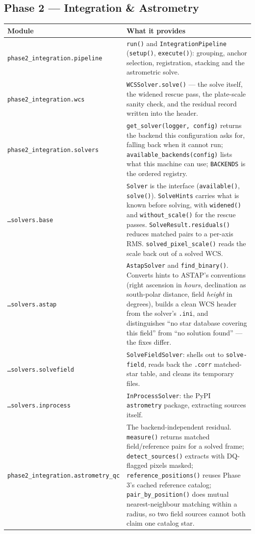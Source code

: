 \documentclass[11pt,a4paper]{article}
\begin{document}
\subsection{Phase 2 --- Integration \& Astrometry}
\begin{center}
\begin{longtable}{|p{3.6cm}|p{10.9cm}|}
\hline
\textbf{Module} & \textbf{What it provides} \\
\hline
\endhead
\texttt{phase2\_integration.\allowbreak pipeline} & \texttt{run()} and \texttt{IntegrationPipeline} (\texttt{setup()}, \texttt{execute()}): grouping, anchor selection, registration, stacking and the astrometric solve. \\
\hline
\texttt{phase2\_integration.\allowbreak wcs} & \texttt{WCSSolver.solve()} --- the solve itself, the widened rescue pass, the plate-scale sanity check, and the residual record written into the header. \\
\hline
\texttt{phase2\_integration.\allowbreak solvers} & \texttt{get\_solver(logger, config)} returns the backend this configuration asks for, falling back when it cannot run; \texttt{available\_backends(config)} lists what this machine can use; \texttt{BACKENDS} is the ordered registry. \\
\hline
\texttt{\ldots solvers.base} & \texttt{Solver} is the interface (\texttt{available()}, \texttt{solve()}). \texttt{SolveHints} carries what is known before solving, with \texttt{widened()} and \texttt{without\_scale()} for the rescue passes. \texttt{SolveResult.residuals()} reduces matched pairs to a per-axis RMS. \texttt{solved\_pixel\_scale()} reads the scale back out of a solved WCS. \\
\hline
\texttt{\ldots solvers.astap} & \texttt{AstapSolver} and \texttt{find\_binary()}. Converts hints to ASTAP's conventions (right ascension in \emph{hours}, declination as south-polar distance, field \emph{height} in degrees), builds a clean WCS header from the solver's \texttt{.ini}, and distinguishes ``no star database covering this field'' from ``no solution found'' --- the fixes differ. \\
\hline
\texttt{\ldots solvers.solvefield} & \texttt{SolveFieldSolver}: shells out to \texttt{solve-field}, reads back the \texttt{.corr} matched-star table, and cleans its temporary files. \\
\hline
\texttt{\ldots solvers.inprocess} & \texttt{InProcessSolver}: the PyPI \texttt{astrometry} package, extracting sources itself. \\
\hline
\texttt{phase2\_integration.\allowbreak astrometry\_qc} & The backend-independent residual. \texttt{measure()} returns matched field/reference pairs for a solved frame; \texttt{detect\_sources()} extracts with DQ-flagged pixels masked; \texttt{reference\_positions()} reuses Phase 3's cached reference catalog; \texttt{pair\_by\_position()} does mutual nearest-neighbour matching within a radius, so two field sources cannot both claim one catalog star. \\

\end{longtable}
\end{center}
\end{document}
